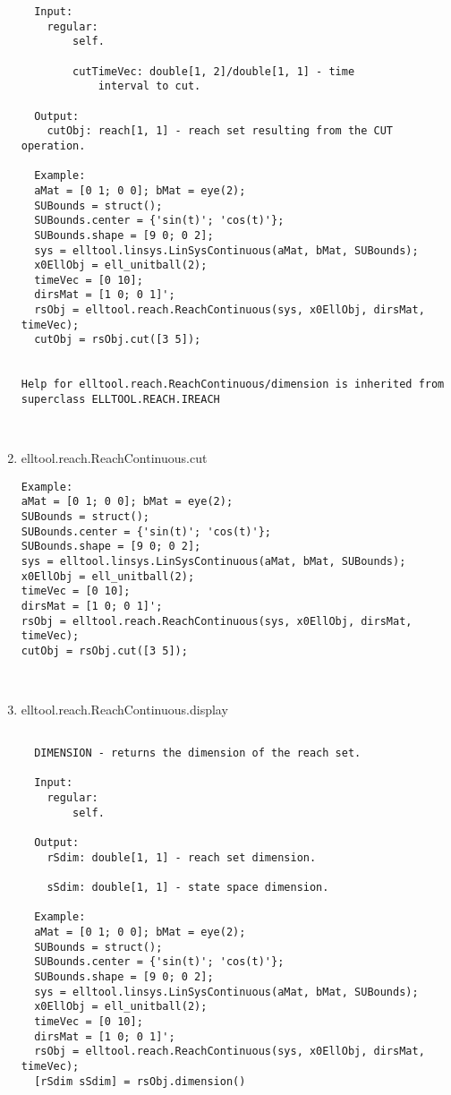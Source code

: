 \begin{enumerate}
\begin{lstlisting}
  Input:
    regular:
        self.

        cutTimeVec: double[1, 2]/double[1, 1] - time
            interval to cut.

  Output:
    cutObj: reach[1, 1] - reach set resulting from the CUT operation.

  Example:
  aMat = [0 1; 0 0]; bMat = eye(2);
  SUBounds = struct();
  SUBounds.center = {'sin(t)'; 'cos(t)'};
  SUBounds.shape = [9 0; 0 2];
  sys = elltool.linsys.LinSysContinuous(aMat, bMat, SUBounds);
  x0EllObj = ell_unitball(2);
  timeVec = [0 10];
  dirsMat = [1 0; 0 1]';
  rsObj = elltool.reach.ReachContinuous(sys, x0EllObj, dirsMat, timeVec);
  cutObj = rsObj.cut([3 5]);


Help for elltool.reach.ReachContinuous/dimension is inherited from superclass ELLTOOL.REACH.IREACH



\end{lstlisting}
\fontfamily{\familydefault}
\selectfont
\item {elltool.reach.ReachContinuous.cut}
\selectfont
\begin{lstlisting}
Example:
aMat = [0 1; 0 0]; bMat = eye(2);
SUBounds = struct();
SUBounds.center = {'sin(t)'; 'cos(t)'};
SUBounds.shape = [9 0; 0 2];
sys = elltool.linsys.LinSysContinuous(aMat, bMat, SUBounds);
x0EllObj = ell_unitball(2);
timeVec = [0 10];
dirsMat = [1 0; 0 1]';
rsObj = elltool.reach.ReachContinuous(sys, x0EllObj, dirsMat, timeVec);
cutObj = rsObj.cut([3 5]);



\end{lstlisting}
\fontfamily{\familydefault}
\selectfont
\item {elltool.reach.ReachContinuous.display}
\selectfont
\begin{lstlisting}

  DIMENSION - returns the dimension of the reach set.

  Input:
    regular:
        self.

  Output:
    rSdim: double[1, 1] - reach set dimension.

    sSdim: double[1, 1] - state space dimension.

  Example:
  aMat = [0 1; 0 0]; bMat = eye(2);
  SUBounds = struct();
  SUBounds.center = {'sin(t)'; 'cos(t)'};
  SUBounds.shape = [9 0; 0 2];
  sys = elltool.linsys.LinSysContinuous(aMat, bMat, SUBounds);
  x0EllObj = ell_unitball(2);
  timeVec = [0 10];
  dirsMat = [1 0; 0 1]';
  rsObj = elltool.reach.ReachContinuous(sys, x0EllObj, dirsMat, timeVec);
  [rSdim sSdim] = rsObj.dimension()


\end{lstlisting}
\end{enumerate}
